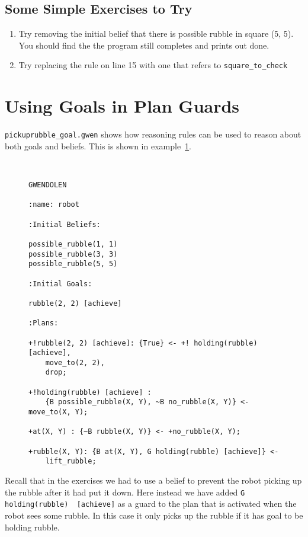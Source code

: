 \subsection{Some Simple Exercises to Try}
\begin{enumerate}
\item Try removing the initial belief that there is possible rubble in
  square (5, 5).  You should find the the program still completes and
  prints out done. 
\item Try replacing the rule on line 15 with one that refers to \lstinline{square_to_check}
\end{enumerate}



\section{Using Goals in Plan Guards}

\texttt{pickuprubble\_goal.gwen} shows how reasoning
rules can be used to reason about both goals
and beliefs.  This is shown in
example~\ref{code:pickuprubble_goal}. 
\begin{figure}[htb]
\begin{ourexample}
\label{code:pickuprubble_goal} \quad \\
\begin{lstlisting}[basicstyle=\sffamily,style=easslisting,language=Gwendolen]
GWENDOLEN

:name: robot

:Initial Beliefs:

possible_rubble(1, 1)
possible_rubble(3, 3)
possible_rubble(5, 5)

:Initial Goals:

rubble(2, 2) [achieve]

:Plans:

+!rubble(2, 2) [achieve]: {True} <- +! holding(rubble)[achieve],
    move_to(2, 2), 
    drop;

+!holding(rubble) [achieve] : 
    {B possible_rubble(X, Y), ~B no_rubble(X, Y)} <- move_to(X, Y);

+at(X, Y) : {~B rubble(X, Y)} <- +no_rubble(X, Y);

+rubble(X, Y): {B at(X, Y), G holding(rubble) [achieve]} <- 
    lift_rubble;
\end{lstlisting}
\end{ourexample}
\end{figure}
Recall that in the exercises
 we had to use a
belief to prevent the robot picking up the rubble after it had put it
down.  Here instead we have added \lstinline{G holding(rubble)  [achieve]} as a guard to the plan that is
activated when the robot sees some rubble.  In this case it only picks
up the rubble if it has goal to be holding rubble. 

